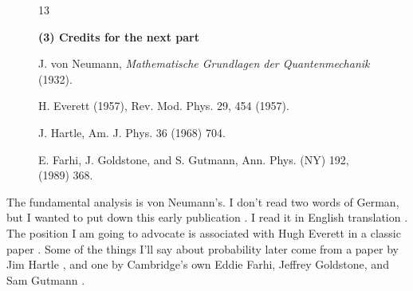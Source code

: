 \documentclass[12pt,nofootinbib]{revtex4}
\begin{document}
\begin{figure}[htb] 
\begin{mdframed}
  \vspace{5pt}\hfill 13\\[-18pt]
  \begin{center}
    \textbf{(3) Credits for the next part}%
  \end{center}
  \begin{raggedright}
  \begin{enumerate}[label={[\roman*]}]\setcounter{enumi}{5}
    \item J. von Neumann, \emph{Mathematische Grundlagen der Quantenmechanik} (1932).
    \item H. Everett (1957), %
      Rev. Mod. Phys. 29, 454 (1957).
    \item J. Hartle, %
      Am. J. Phys. 36 (1968) 704.
    \item E. Farhi, J. Goldstone, and S. Gutmann, %
      Ann. Phys. (NY) 192, (1989) 368.

  \end{enumerate}
  \end{raggedright}
  \vspace{6pt}
\end{mdframed}
\end{figure}

The fundamental analysis is von Neumann's. I don't read two words of German, but I wanted to put down this early publication \cite{Neumann32}. I read it in English translation \cite{Neumann55}. The position I am going to advocate is associated with Hugh Everett in a classic paper \cite{everett57rmp454}. Some of the things I'll say about probability later come from a paper by Jim Hartle \cite{hartle68ajp704}, and one by Cambridge's own Eddie Farhi, Jeffrey Goldstone, and Sam Gutmann \cite{farhi-89ap368}.
\end{document}
